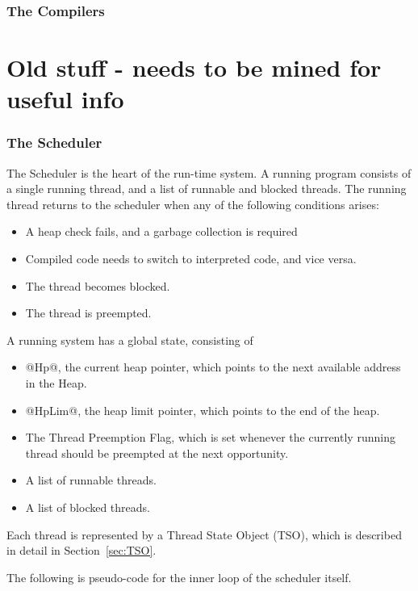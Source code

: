 \documentclass[11pt]{article}
\newcommand{\secref}[1]{Section~\ref{sec:#1}}
\begin{document}
\section{The Compilers}

\iffalse
\part{Old stuff - needs to be mined for useful info}

\section{The Scheduler}

The Scheduler is the heart of the run-time system.  A running program
consists of a single running thread, and a list of runnable and
blocked threads.  The running thread returns to the scheduler when any
of the following conditions arises:

\begin{itemize}
\item A heap check fails, and a garbage collection is required
\item Compiled code needs to switch to interpreted code, and vice
versa.
\item The thread becomes blocked.
\item The thread is preempted.
\end{itemize}

A running system has a global state, consisting of

\begin{itemize}
\item @Hp@, the current heap pointer, which points to the next
available address in the Heap.
\item @HpLim@, the heap limit pointer, which points to the end of the
heap.
\item The Thread Preemption Flag, which is set whenever the currently
running thread should be preempted at the next opportunity.
\item A list of runnable threads. 
\item A list of blocked threads.
\end{itemize}

Each thread is represented by a Thread State Object (TSO), which is
described in detail in \secref{TSO}.

The following is pseudo-code for the inner loop of the scheduler
itself.
\end{document}
